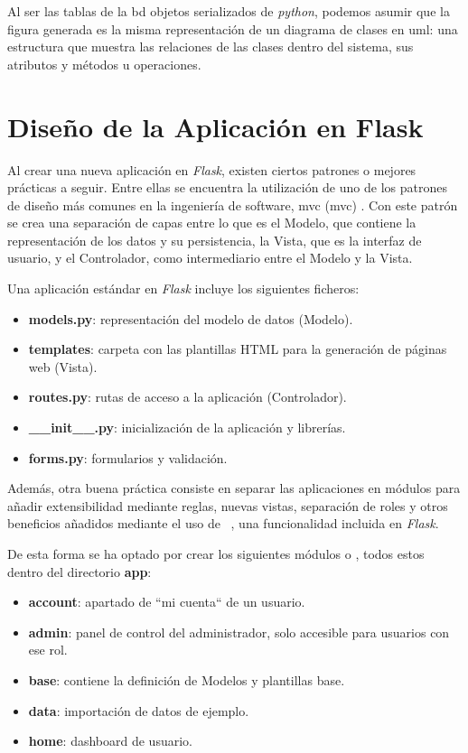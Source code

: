 \documentclass[11pt,spanish,listoffigures,listoftables]{tfgetsinf}
\begin{document}
Al ser las tablas de la \acrshort{bd} objetos serializados de \textit{python}, podemos asumir que la figura generada es la misma representación de un diagrama de clases en \acrfull{uml}: una estructura que muestra las relaciones de las clases dentro del sistema, sus atributos y métodos u operaciones.

\section{Diseño de la Aplicación en Flask}

Al crear una nueva aplicación en \textit{Flask}, existen ciertos patrones o mejores prácticas a seguir. Entre ellas se encuentra la utilización de uno de los patrones de diseño más comunes en la ingeniería de software, \acrlong{mvc} (\acrshort{mvc}) \cite{book-mvc}. Con este patrón se crea una separación de capas entre lo que es el Modelo, que contiene la representación de los datos y su persistencia, la Vista, que es la interfaz de usuario, y el Controlador, como intermediario entre el Modelo y la Vista.

Una aplicación estándar en \textit{Flask} incluye los siguientes ficheros:
\begin{itemize}
	\item \textbf{models.py}: representación del modelo de datos (Modelo).
	\item \textbf{templates}: carpeta con las plantillas HTML para la generación de páginas web (Vista).
	\item \textbf{routes.py}: rutas de acceso a la aplicación (Controlador).
	\item \textbf{\_\_init\_\_.py}: inicialización de la aplicación y librerías.
	\item \textbf{forms.py}: formularios y validación.
\end{itemize}

Además, otra buena práctica consiste en separar las aplicaciones en módulos para añadir extensibilidad mediante reglas, nuevas vistas, separación de roles y otros beneficios añadidos mediante el uso de ~\cite{book-mastering-flask}, una funcionalidad incluida en \textit{Flask}.

De esta forma se ha optado por crear los siguientes módulos o , todos estos dentro del directorio \textbf{app}:

\begin{itemize}
    \item \textbf{account}: apartado de ``mi cuenta`` de un usuario.
    \item \textbf{admin}: panel de control del administrador, solo accesible para usuarios con ese rol.
	\item \textbf{base}: contiene la definición de Modelos y plantillas base.
    \item \textbf{data}: importación de datos de ejemplo.
    \item \textbf{home}: \foreignlanguage{english}{dashboard} de usuario.
\end{itemize}
\end{document}
